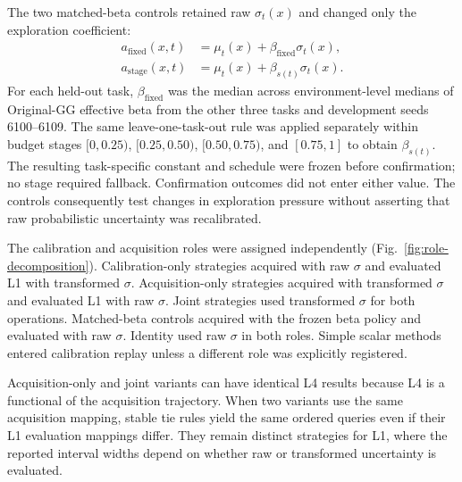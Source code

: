 \documentclass[10pt]{article}
\begin{document}
The two matched-beta controls retained raw $\sigma_t(x)$ and changed only the
exploration coefficient:
\begin{align}
a_{\mathrm{fixed}}(x,t) &=
\mu_t(x)+\beta_{\mathrm{fixed}}\sigma_t(x),\\
a_{\mathrm{stage}}(x,t) &=
\mu_t(x)+\beta_{s(t)}\sigma_t(x).
\end{align}
For each held-out task, $\beta_{\mathrm{fixed}}$ was the median across
environment-level medians of Original-GG effective beta from the other three
tasks and development seeds 6100--6109. The same leave-one-task-out rule was
applied separately within budget stages $[0,0.25)$, $[0.25,0.50)$,
$[0.50,0.75)$, and $[0.75,1]$ to obtain $\beta_{s(t)}$. The resulting
task-specific constant and schedule were frozen before confirmation; no stage
required fallback. Confirmation outcomes did not enter either value. The
controls consequently test changes in exploration pressure without asserting
that raw probabilistic uncertainty was recalibrated.

The calibration and acquisition roles were assigned independently
(Fig.~\ref{fig:role-decomposition}). Calibration-only strategies acquired with raw
$\sigma$ and evaluated L1 with transformed $\sigma$. Acquisition-only
strategies acquired with transformed $\sigma$ and evaluated L1 with raw
$\sigma$. Joint strategies used transformed $\sigma$ for both operations.
Matched-beta controls acquired with the frozen beta policy and evaluated with
raw $\sigma$. Identity used raw $\sigma$ in both roles. Simple scalar methods
entered calibration replay unless a different role was explicitly registered.

Acquisition-only and joint variants can have identical L4 results because L4
is a functional of the acquisition trajectory. When two variants use the same
acquisition mapping, stable tie rules yield the same ordered queries even if
their L1 evaluation mappings differ. They remain distinct strategies for L1,
where the reported interval widths depend on whether raw or transformed
uncertainty is evaluated.
\end{document}
